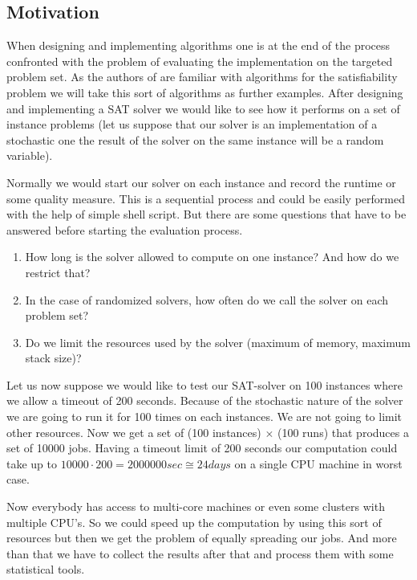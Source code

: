\subsection{Motivation}


When designing and implementing algorithms one is at the end of the process confronted with the problem of evaluating the implementation on the targeted problem set. As the authors of \edacc are familiar with algorithms for the satisfiability problem we will take this sort of algorithms as further examples. After designing and implementing a SAT solver we would like to see how it performs on a set of instance problems (let us suppose that our solver is an implementation of a stochastic one \ie the result of the solver on the same instance will be a random variable).

Normally we would start our solver on each instance and record the runtime or some quality measure. This is a sequential process and could be easily performed with the help of simple shell script. But there are some questions that have to be answered before starting the evaluation process. 

\begin{enumerate}
\item How long is the solver allowed to compute on one instance? And how do we restrict that?
\item In the case of randomized solvers, how often do we call the solver on each problem set?
\item Do we limit the resources used by the solver (\ie maximum of memory, maximum stack size)?
\end{enumerate}

Let us now suppose we would like to test our SAT-solver on 100 instances where we allow a timeout of 200 seconds. \marginlabel{\Eexample}  Because of the stochastic nature of the solver we are going to run it for 100 times on each instances. We are not going to limit other resources. Now we get a set of (100 instances) $\times$ (100 runs) that produces a set of 10000 jobs. Having a timeout limit of 200 seconds our computation could take up to $10000\cdot 200=2000000sec\cong24 days$ on a single CPU machine in worst case. 

Now everybody has access to multi-core machines or even some clusters with multiple CPU's. So we could speed up the computation by using this sort of resources but then we get the problem of equally spreading our jobs. And more than that we have to collect the results after that and process them with some statistical tools. 

